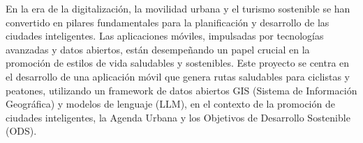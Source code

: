 
En la era de la digitalización, la movilidad urbana y el turismo sostenible se han
convertido en pilares fundamentales para la planificación y desarrollo de las ciudades
inteligentes. Las aplicaciones móviles, impulsadas por tecnologías avanzadas y datos
abiertos, están desempeñando un papel crucial en la promoción de estilos de vida
saludables y sostenibles. Este proyecto se centra en el desarrollo de una aplicación móvil
que genera rutas saludables para ciclistas y peatones, utilizando un framework de datos
abiertos GIS (Sistema de Información Geográfica) y modelos de lenguaje (LLM), en el
contexto de la promoción de ciudades inteligentes, la Agenda Urbana y los Objetivos de
Desarrollo Sostenible (ODS). 
